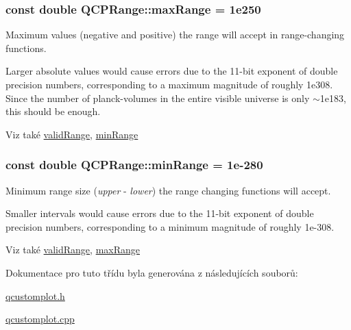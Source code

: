 \subsubsection[{max\+Range}]{\setlength{\rightskip}{0pt plus 5cm}const double Q\+C\+P\+Range\+::max\+Range = 1e250\hspace{0.3cm}{\ttfamily [static]}}\label{classQCPRange_a5ca51e7a2dc5dc0d49527ab171fe1f4f}


Maximum values (negative and positive) the range will accept in range-\/changing functions. 

Larger absolute values would cause errors due to the 11-\/bit exponent of double precision numbers, corresponding to a maximum magnitude of roughly 1e308. Since the number of planck-\/volumes in the entire visible universe is only $\sim$1e183, this should be enough. \begin{DoxySeeAlso}{Viz také}
\hyperlink{classQCPRange_ab38bd4841c77c7bb86c9eea0f142dcc0}{valid\+Range}, \hyperlink{classQCPRange_ab46d3bc95030ee25efda41b89e2b616b}{min\+Range} 
\end{DoxySeeAlso}
\hypertarget{classQCPRange_ab46d3bc95030ee25efda41b89e2b616b}{}
\subsubsection[{min\+Range}]{\setlength{\rightskip}{0pt plus 5cm}const double Q\+C\+P\+Range\+::min\+Range = 1e-\/280\hspace{0.3cm}{\ttfamily [static]}}\label{classQCPRange_ab46d3bc95030ee25efda41b89e2b616b}


Minimum range size ({\itshape upper} -\/ {\itshape lower}) the range changing functions will accept. 

Smaller intervals would cause errors due to the 11-\/bit exponent of double precision numbers, corresponding to a minimum magnitude of roughly 1e-\/308. \begin{DoxySeeAlso}{Viz také}
\hyperlink{classQCPRange_ab38bd4841c77c7bb86c9eea0f142dcc0}{valid\+Range}, \hyperlink{classQCPRange_a5ca51e7a2dc5dc0d49527ab171fe1f4f}{max\+Range} 
\end{DoxySeeAlso}


Dokumentace pro tuto třídu byla generována z následujících souborů\+:\begin{DoxyCompactItemize}
\item 
\hyperlink{qcustomplot_8h}{qcustomplot.\+h}\item 
\hyperlink{qcustomplot_8cpp}{qcustomplot.\+cpp}\end{DoxyCompactItemize}
